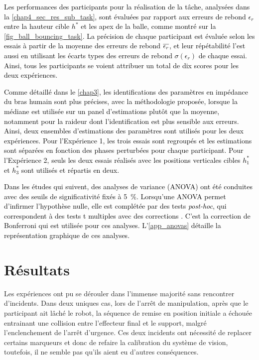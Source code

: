 \textcolor{black}{Les performances des participants pour la réalisation de la tâche, analysées dans la \cref{chap4_sec_res_sub_task}, sont évaluées par rapport aux erreurs de rebond $\epsilon_r$ entre la hauteur cible $h^*$ et les apex de la balle, comme montré sur la \cref{fig_ball_bouncing_task}. La précision de chaque participant est évaluée selon les essais à partir de la moyenne des erreurs de rebond $\overline{\epsilon_r}$, et leur répétabilité l'est aussi en utilisant les écarts types des erreurs de rebond $\sigma(\epsilon_r)$ de chaque essai. Ainsi, tous les participants se voient attribuer un total de dix scores pour les deux expériences.}

\textcolor{black}{Comme détaillé dans le \cref{chap3}, les identifications des paramètres en impédance du bras humain sont plus précises, avec la méthodologie proposée, lorsque la médiane est utilisée sur un panel d'estimations plutôt que la moyenne, notamment pour la raideur dont l'identification est plus sensible aux erreurs. Ainsi, deux ensembles d'estimations des paramètres sont utilisés pour les deux expériences. Pour l'Expérience 1, les trois essais sont regroupés et les estimations sont séparées en fonction des phases perturbées pour chaque participant. Pour l'Expérience 2, seuls les deux essais réalisés avec les positions verticales cibles $h_1^*$ et $h_3^*$ sont utilisés et répartis en deux.}

\textcolor{black}{Dans les études qui suivent, des analyses de variance (ANOVA) ont été conduites avec des seuils de significativité fixés à \SI{5}{\percent}. Lorsqu'une ANOVA permet d'infirmer l'hypothèse nulle, elle est complétée par des tests \textit{post-hoc}, qui correspondent à des tests t \parencite{student_probable_1908} multiples avec des corrections \parencite{tukey_comparing_1949,dunn_multiple_1961}. C'est la correction de Bonferroni qui est utilisée pour ces analyses. L'\cref{app_anovas} détaille la représentation graphique de ces analyses.}

\section{Résultats} \label{chap4_sec_res}

Les expériences ont pu se dérouler dans l'immense majorité sans rencontrer d'incidents. Dans deux uniques cas, lors de l'arrêt de manipulation, après que le participant ait lâché le robot, la séquence de remise en position initiale a échouée entrainant une collision entre l'effecteur final et le support, malgré l'enclenchement de l'arrêt d'urgence. Ces deux incidents ont nécessité de replacer certains marqueurs et donc de refaire la calibration du système de vision, toutefois, il ne semble pas qu'ils aient eu d'autres conséquences.

